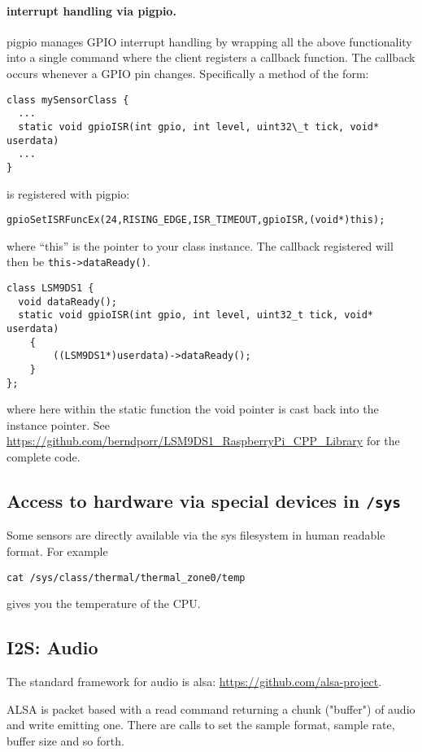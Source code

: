 \documentclass[12pt]{report}
\begin{document}
\paragraph{interrupt handling via pigpio.}
pigpio manages GPIO interrupt handling by wrapping all the above
functionality into a single command where the client registers a
callback function. The callback occurs whenever a GPIO pin changes.
Specifically a method of the form:
\begin{verbatim}
class mySensorClass {
  ...
  static void gpioISR(int gpio, int level, uint32\_t tick, void* userdata)
  ...
}
\end{verbatim}
is registered with pigpio:
\begin{verbatim}
gpioSetISRFuncEx(24,RISING_EDGE,ISR_TIMEOUT,gpioISR,(void*)this);
\end{verbatim}
where ``this'' is the pointer to your class instance.
The callback registered will then be \texttt{this->dataReady()}.
\begin{verbatim}
class LSM9DS1 {
  void dataReady();
  static void gpioISR(int gpio, int level, uint32_t tick, void* userdata)
    {
        ((LSM9DS1*)userdata)->dataReady();
    }
};
\end{verbatim}
where here within the static function the void pointer is cast back into the instance pointer.
See \url{https://github.com/berndporr/LSM9DS1_RaspberryPi_CPP_Library} for the complete code.



\subsection{Access to hardware via special devices in \texttt{/sys}}
Some sensors are directly available via the sys filesystem in human readable format.
For example
\begin{verbatim}
cat /sys/class/thermal/thermal_zone0/temp
\end{verbatim}
gives you the temperature of the CPU.




\subsection{I2S: Audio}
The standard framework for audio is alsa: \url{https://github.com/alsa-project}.

ALSA is packet based with a read command
returning a chunk ("buffer") of audio and write emitting one.
There are calls to set the sample format, sample rate, buffer size
and so forth.
\end{document}
